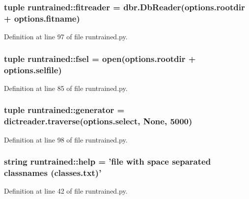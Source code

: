 \hypertarget{namespaceruntrained_a72631b46f06124a8e59941c86e742ddd}{
\subsubsection[{fitreader}]{\setlength{\rightskip}{0pt plus 5cm}tuple {\bf runtrained::fitreader} = dbr.DbReader(options.rootdir + options.fitname)}}
\label{namespaceruntrained_a72631b46f06124a8e59941c86e742ddd}


Definition at line 97 of file runtrained.py.

\hypertarget{namespaceruntrained_af1d361ee115528276a9091cc15b6a1e3}{
\subsubsection[{fsel}]{\setlength{\rightskip}{0pt plus 5cm}tuple {\bf runtrained::fsel} = open(options.rootdir + options.selfile)}}
\label{namespaceruntrained_af1d361ee115528276a9091cc15b6a1e3}


Definition at line 85 of file runtrained.py.

\hypertarget{namespaceruntrained_a2a2f2ebf0c161ef1aed89d58b4fa0c9e}{
\subsubsection[{generator}]{\setlength{\rightskip}{0pt plus 5cm}tuple {\bf runtrained::generator} = dictreader.traverse(options.select, None, 5000)}}
\label{namespaceruntrained_a2a2f2ebf0c161ef1aed89d58b4fa0c9e}


Definition at line 98 of file runtrained.py.

\hypertarget{namespaceruntrained_a32ffe7cf2f0e4d678b595d78bfdf3305}{
\subsubsection[{help}]{\setlength{\rightskip}{0pt plus 5cm}string {\bf runtrained::help} = 'file with space separated classnames (classes.txt)'}}
\label{namespaceruntrained_a32ffe7cf2f0e4d678b595d78bfdf3305}


Definition at line 42 of file runtrained.py.

